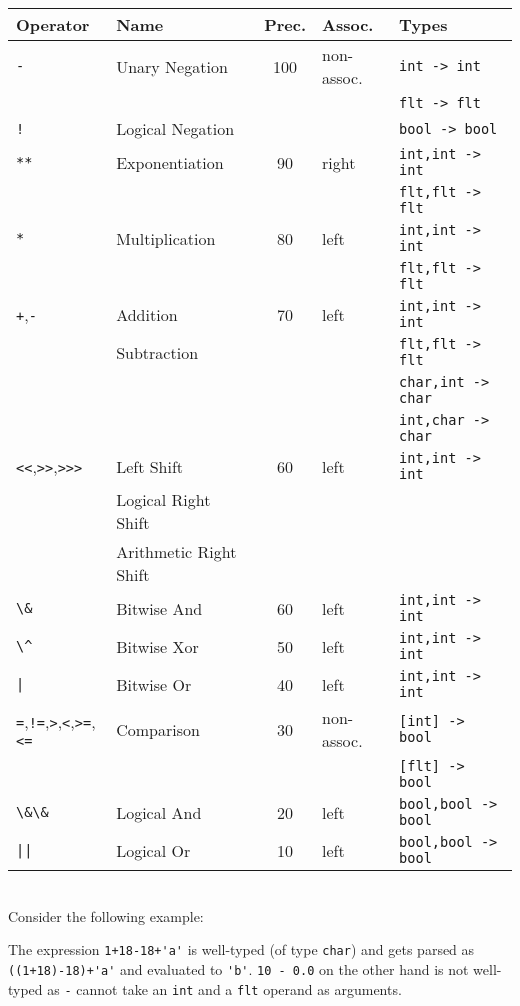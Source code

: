 \documentclass{article}
\newcommand{\code}[1]{\lstinline[columns=fixed]{#1}}
\begin{document}
		\begin{tabular}{l|l|c|l|l}
			\textbf{Operator} & \textbf{Name} & \textbf{Prec.} & \textbf{Assoc.} & \textbf{Types}\\
			\midrule
			\code{-} & Unary Negation & 100 & non-assoc. & \code{int -> int}\\
				&&&& \code{flt -> flt}\\
			\code{!} & Logical Negation &&& \code{bool -> bool}\\
			\midrule
			\code{**} & Exponentiation & 90 & right & \code{int,int -> int}\\
				&&&& \code{flt,flt -> flt}\\
			\midrule
			\code{*} & Multiplication & 80 & left & \code{int,int -> int}\\
				&&&& \code{flt,flt -> flt}\\
			\midrule
			\code{+},\code{-} & Addition & 70 & left & \code{int,int -> int}\\
				& Subtraction &&& \code{flt,flt -> flt}\\
				&&&& \code{char,int -> char}\\
				&&&& \code{int,char -> char}\\
			\midrule
			\code{<<},\code{>>},\code{>>>} & Left Shift & 60 & left & \code{int,int -> int}\\
			& Logical Right Shift &&& \\
			& Arithmetic Right Shift &&& \\
			\midrule
			\code{\&} & Bitwise And & 60 & left & \code{int,int -> int}\\
			\midrule
			\code{\^} & Bitwise Xor & 50 & left & \code{int,int -> int}\\
			\midrule
			\code{|} & Bitwise Or & 40 & left & \code{int,int -> int}\\
			\midrule
			\code{=},\code{!=},\code{>},\code{<},\code{>=},\code{<=} & Comparison & 30 & non-assoc. & \code{[int] -> bool} \\
				&&&& \code{[flt] -> bool}\\
			\midrule
			\code{\&\&} & Logical And & 20 & left & \code{bool,bool -> bool}\\
			\midrule
			\code{||} & Logical Or & 10 & left & \code{bool,bool -> bool}
		\end{tabular}\\
	
		Consider the following example:
		
		The expression \code{1+18-18+'a'} is well-typed (of type \code{char}) and gets parsed as \code{((1+18)-18)+'a'} and evaluated to \code{'b'}. \code{10 - 0.0} on the other hand is not well-typed as \code{-} cannot take an \code{int} and a \code{flt} operand as arguments.
		
\end{document}
